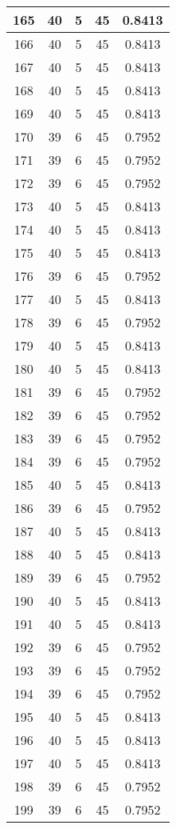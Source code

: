\documentclass[letterpaper, 12pt]{article}
\begin{document}
\begin{longtable}{|c|c|c|c|c|}
\hline
165 & 40 & 5 & 45 & 0.8413 \\
\hline
166 & 40 & 5 & 45 & 0.8413 \\
\hline
167 & 40 & 5 & 45 & 0.8413 \\
\hline
168 & 40 & 5 & 45 & 0.8413 \\
\hline
169 & 40 & 5 & 45 & 0.8413 \\
\hline
170 & 39 & 6 & 45 & 0.7952 \\
\hline
171 & 39 & 6 & 45 & 0.7952 \\
\hline
172 & 39 & 6 & 45 & 0.7952 \\
\hline
173 & 40 & 5 & 45 & 0.8413 \\
\hline
174 & 40 & 5 & 45 & 0.8413 \\
\hline
175 & 40 & 5 & 45 & 0.8413 \\
\hline
176 & 39 & 6 & 45 & 0.7952 \\
\hline
177 & 40 & 5 & 45 & 0.8413 \\
\hline
178 & 39 & 6 & 45 & 0.7952 \\
\hline
179 & 40 & 5 & 45 & 0.8413 \\
\hline
180 & 40 & 5 & 45 & 0.8413 \\
\hline
181 & 39 & 6 & 45 & 0.7952 \\
\hline
182 & 39 & 6 & 45 & 0.7952 \\
\hline
183 & 39 & 6 & 45 & 0.7952 \\
\hline
184 & 39 & 6 & 45 & 0.7952 \\
\hline
185 & 40 & 5 & 45 & 0.8413 \\
\hline
186 & 39 & 6 & 45 & 0.7952 \\
\hline
187 & 40 & 5 & 45 & 0.8413 \\
\hline
188 & 40 & 5 & 45 & 0.8413 \\
\hline
189 & 39 & 6 & 45 & 0.7952 \\
\hline
190 & 40 & 5 & 45 & 0.8413 \\
\hline
191 & 40 & 5 & 45 & 0.8413 \\
\hline
192 & 39 & 6 & 45 & 0.7952 \\
\hline
193 & 39 & 6 & 45 & 0.7952 \\
\hline
194 & 39 & 6 & 45 & 0.7952 \\
\hline
195 & 40 & 5 & 45 & 0.8413 \\
\hline
196 & 40 & 5 & 45 & 0.8413 \\
\hline
197 & 40 & 5 & 45 & 0.8413 \\
\hline
198 & 39 & 6 & 45 & 0.7952 \\
\hline
199 & 39 & 6 & 45 & 0.7952 \\
\hline
\end{longtable}
\end{document}

